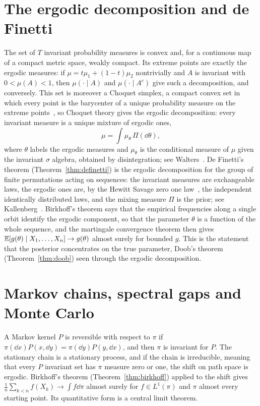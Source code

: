 \section{The ergodic decomposition and de Finetti}

The set of $T$ invariant probability measures is convex and, for a continuous map of a compact metric space, weakly compact. Its extreme points are exactly the ergodic measures: if $\mu = t\mu_1+(1-t)\mu_2$ nontrivially and $A$ is invariant with $0<\mu(A)<1$, then $\mu(\cdot\mid A)$ and $\mu(\cdot\mid A^c)$ give such a decomposition, and conversely. This set is moreover a Choquet simplex, a compact convex set in which every point is the barycenter of a unique probability measure on the extreme points~\cite{phelps2001}, so Choquet theory gives the ergodic decomposition: every invariant measure is a unique mixture of ergodic ones,
\[
\mu = \int\mu_\theta\,\Pi(\dd\theta),
\]
where $\theta$ labels the ergodic measures and $\mu_\theta$ is the conditional measure of $\mu$ given the invariant $\sigma$ algebra, obtained by disintegration; see Walters~\cite{walters1982}. De Finetti's theorem (Theorem~\ref{thm:definetti}) is the ergodic decomposition for the group of finite permutations acting on sequences: the invariant measures are exchangeable laws, the ergodic ones are, by the Hewitt Savage zero one law~\cite{hewittsavage1955}, the independent identically distributed laws, and the mixing measure $\Pi$ is the prior; see Kallenberg~\cite{kallenberg2005}. Birkhoff's theorem says that the empirical frequencies along a single orbit identify the ergodic component, so that the parameter $\theta$ is a function of the whole sequence, and the martingale convergence theorem then gives $\mathbb{E}[g(\theta)\mid X_1,\dots,X_n]\to g(\theta)$ almost surely for bounded $g$. This is the statement that the posterior concentrates on the true parameter, Doob's theorem~\cite{doob1949} (Theorem~\ref{thm:doob}) seen through the ergodic decomposition.

\section{Markov chains, spectral gaps and Monte Carlo}\label{sec:markov_spectral_mc}

A Markov kernel $P$ is reversible with respect to $\pi$ if $\pi(\dd x)P(x,\dd y) = \pi(\dd y)P(y,\dd x)$, and then $\pi$ is invariant for $P$. The stationary chain is a stationary process, and if the chain is irreducible, meaning that every $P$ invariant set has $\pi$ measure zero or one, the shift on path space is ergodic. Birkhoff's theorem (Theorem~\ref{thm:birkhoff}) applied to the shift gives $\frac1n\sum_{k<n}f(X_k)\to\int f\dd\pi$ almost surely for $f\in L^1(\pi)$ and $\pi$ almost every starting point. Its quantitative form is a central limit theorem.


